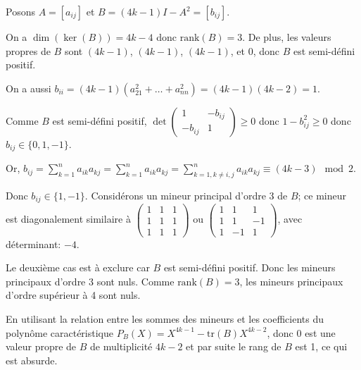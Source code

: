 \documentclass{article}
\begin{document}
Posons \( A = [a_{ij}] \) et \( B = (4k - 1)I - A^2 = [b_{ij}] \).

On a \( \dim(\ker(B)) = 4k - 4 \) donc \( \text{rank}(B) = 3 \). De plus, les valeurs propres de \( B \) sont \( (4k - 1) \), \( (4k - 1) \), \( (4k - 1) \), et \( 0 \), donc \( B \) est semi-défini positif.

On a aussi \( b_{ii} = (4k - 1)(a_{21}^2 + \ldots + a_{nn}^2) = (4k - 1)(4k - 2) = 1 \).

Comme \( B \) est semi-défini positif, \( \det \begin{pmatrix}
1 & -b_{ij} \\
-b_{ij} & 1
\end{pmatrix} \geq 0 \) donc \( 1 - b_{ij}^2 \geq 0 \) donc \( b_{ij} \in \{0, 1, -1\} \).

Or, \( b_{ij} = \sum_{k=1}^n a_{ik} a_{kj} = \sum_{k=1}^n a_{ik} a_{kj} = \sum_{k=1, k \neq i,j}^n a_{ik} a_{kj} \equiv (4k - 3) \mod 2 \).

Donc \( b_{ij} \in \{1, -1\} \). Considérons un mineur principal d'ordre 3 de \( B \); ce mineur est diagonalement similaire à \( \begin{pmatrix}
1 & 1 & 1 \\
1 & 1 & 1 \\
1 & 1 & 1
\end{pmatrix} \) ou \( \begin{pmatrix}
1 & 1 & 1 \\
1 & 1 & -1 \\
1 & -1 & 1
\end{pmatrix} \), avec déterminant: \(-4\).

Le deuxième cas est à exclure car \( B \) est semi-défini positif. Donc les mineurs principaux d'ordre 3 sont nuls. Comme \( \text{rank}(B) = 3 \), les mineurs principaux d'ordre supérieur à 4 sont nuls.

En utilisant la relation entre les sommes des mineurs et les coefficients du polynôme caractéristique \( P_B(X) = X^{4k-1} - \text{tr}(B)X^{4k-2} \), donc \( 0 \) est une valeur propre de \( B \) de multiplicité \( 4k - 2 \) et par suite le rang de \( B \) est 1, ce qui est absurde.
\end{document}
